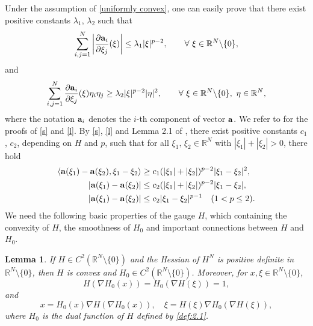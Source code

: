 \documentclass[12pt]{amsart}
\newtheorem{lem}[thm]{Lemma}
\theoremstyle{definition}
\theoremstyle{remark}
\theoremstyle{conclusion}
\theoremstyle{conjecture}
\numberwithin{equation}{section}
\begin{document}
Under the assumption of \eqref{uniformly convex}, one can easily prove that there exist positive constants $\lambda_1$, $\lambda_2$ such that
\begin{equation}\label{s}
  \sum\limits_{i,j=1}^{N}\left\lvert \frac{\partial {\bf{a}}_i}{\partial \xi_j}(\xi)\right\rvert \leq \lambda_1|\xi|^{p-2},\qquad\forall\,\,\xi\in\mathbb{R}^N\backslash\{0\},
\end{equation}
and
\begin{equation}\label{l}
  \sum\limits_{i,j=1}^{N} \frac{\partial {\bf{a}}_i}{\partial \xi_j}(\xi)\eta_i\eta_j \geq \lambda_2|\xi|^{p-2}|\eta|^2,\qquad\forall\,\,\xi\in\mathbb{R}^N\backslash\{0\},\,\,\eta\in\mathbb{R}^N,
\end{equation}
where the notation ${\bf{a}}_i$ denotes the $i$-th component of vector ${\bf{a}}$. We refer to \cite{CHN} for the proofs of \eqref{s} and \eqref{l}. By \eqref{s}, \eqref{l} and Lemma 2.1 of \cite{Da}, there exist positive constants $c_1$, $c_2$, depending on $H$ and $p$, such that for all  $\xi_1,\,\xi_2\in\mathbb{R}^N$ with $|\xi_1|+|\xi_2|>0$, there hold
\begin{equation}\label{vector inequalities}
 \begin{aligned}
  \left\langle {\bf{a}}(\xi_1)-{\bf{a}}(\xi_2),\xi_1-\xi_2\right\rangle&\geq c_1(|\xi_1|+|\xi_2|)^{p-2}|\xi_1-\xi_2|^2,\\
  \left\lvert {\bf{a}}(\xi_1)-{\bf{a}}(\xi_2)\right\rvert &\leq c_2(|\xi_1|+|\xi_2|)^{p-2}|\xi_1-\xi_2|,\\
  \left\lvert {\bf{a}}(\xi_1)-{\bf{a}}(\xi_2)\right\rvert &\leq c_2|\xi_1-\xi_2|^{p-1}\quad(1<p\leq2).
 \end{aligned}
\end{equation}
\medskip
We need the following basic properties of the gauge $H$, which containing the convexity of $H$, the smoothness of $H_0$ and important connections between $H$ and $H_0$.
\begin{lem}\cite[Lemma 2.2]{CL1}\label{8,le:2.2}
If $H\in C^2(\mathbb{R}^N\setminus\{0\})$ and the Hessian of $H^{N}$ is positive definite in $\mathbb{R}^N\setminus\{0\}$, then $H$ is convex and $H_{0}\in C^2(\mathbb{R}^N\setminus\{0\})$. Moreover, for $x,\xi\in\mathbb{R}^N\setminus\{0\}$,
\begin{equation*}
H\left(\nabla H_0(x)\right)=H_0(\nabla H(\xi))=1,
\end{equation*}
and
\begin{equation*}\label{eq:2.2}
x=H_0(x) \nabla H\left(\nabla H_0(x)\right), \quad \xi=H(\xi) \nabla H_0(\nabla H(\xi)),
\end{equation*}
where $H_0$ is the dual function of $H$ defined by \eqref{def:2.1}.
\end{lem}
\end{document}
